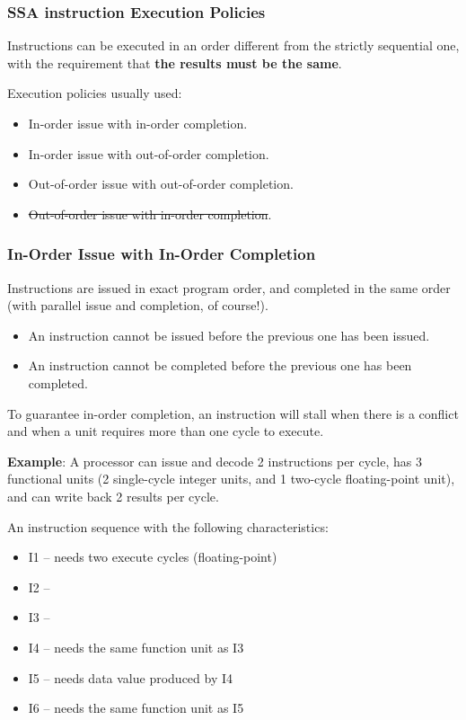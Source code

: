 \subsubsection{SSA instruction Execution Policies}
Instructions can be executed in an order different from the strictly sequential one, with the requirement that \textbf{the results must be the same}.

Execution policies usually used:
\begin{itemize}
\item In-order issue with in-order completion.
\item In-order issue with out-of-order completion.
\item Out-of-order issue with out-of-order completion.
\item \st{Out-of-order issue with in-order completion}.
\end{itemize}

\subsubsection{In-Order Issue with In-Order Completion}
Instructions are issued in exact program order, and completed in the same order (with parallel issue and completion, of course!).
\begin{itemize}
\item An instruction cannot be issued before the previous one has been issued.
\item An instruction cannot be completed before the previous one has been completed.
\end{itemize}

To guarantee in-order completion, an instruction will stall when there is a conflict and when a unit requires more than one cycle to execute.

\textbf{Example}: A processor can issue and decode 2 instructions per cycle, has 3 functional units (2 single-cycle integer units, and 1 two-cycle floating-point unit), and can write back 2 results per cycle.

An instruction sequence with the following characteristics:

\begin{itemize}
\item I1 – needs two execute cycles (floating-point)
\item I2 –
\item I3 –
\item I4 – needs the same function unit as I3
\item I5 – needs data value produced by I4
\item I6 – needs the same function unit as I5
\end{itemize}

